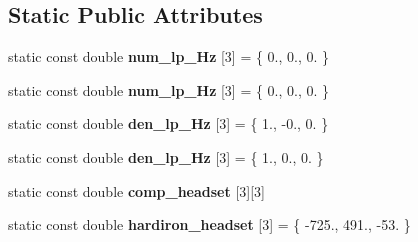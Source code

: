 \subsection*{Static Public Attributes}
\begin{DoxyCompactItemize}
\item 
\hypertarget{classKinDrv_1_1Robot__IMU__Control_aa2fc25bf279cb217eb7922349ed7342c}{static const double {\bfseries num\+\_\+lp\+\_\+Hz} \mbox{[}3\mbox{]} = \{ 0., 0., 0. \}}\label{classKinDrv_1_1Robot__IMU__Control_aa2fc25bf279cb217eb7922349ed7342c}

\item 
\hypertarget{classKinDrv_1_1Robot__IMU__Control_a73d77428f98c333ba1c28854ff842aae}{static const double {\bfseries num\+\_\+lp\+\_\+Hz} \mbox{[}3\mbox{]} = \{ 0., 0., 0. \}}\label{classKinDrv_1_1Robot__IMU__Control_a73d77428f98c333ba1c28854ff842aae}

\item 
\hypertarget{classKinDrv_1_1Robot__IMU__Control_ae0cf744e68ddfc1ecd54386cae50ac68}{static const double {\bfseries den\+\_\+lp\+\_\+Hz} \mbox{[}3\mbox{]} = \{ 1., -\/0., 0. \}}\label{classKinDrv_1_1Robot__IMU__Control_ae0cf744e68ddfc1ecd54386cae50ac68}

\item 
\hypertarget{classKinDrv_1_1Robot__IMU__Control_ae24f49173560ac964ffd9749e22e90f9}{static const double {\bfseries den\+\_\+lp\+\_\+Hz} \mbox{[}3\mbox{]} = \{ 1., 0., 0. \}}\label{classKinDrv_1_1Robot__IMU__Control_ae24f49173560ac964ffd9749e22e90f9}

\item 
static const double {\bfseries comp\+\_\+headset} \mbox{[}3\mbox{]}\mbox{[}3\mbox{]}
\item 
\hypertarget{classKinDrv_1_1Robot__IMU__Control_a6f50736a1e8c2ad27e08bdc890ebb5bb}{static const double {\bfseries hardiron\+\_\+headset} \mbox{[}3\mbox{]} = \{ -\/725., 491., -\/53. \}}\label{classKinDrv_1_1Robot__IMU__Control_a6f50736a1e8c2ad27e08bdc890ebb5bb}

\end{DoxyCompactItemize}


